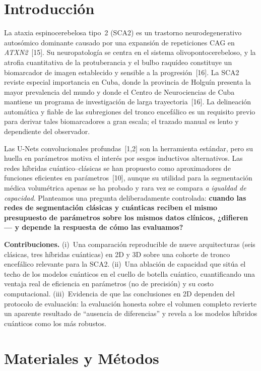 \documentclass[runningheads]{llncs}
\begin{document}
\section{Introducción}
La ataxia espinocerebelosa tipo~2 (SCA2) es un trastorno neurodegenerativo
autosómico dominante causado por una expansión de repeticiones CAG en
\emph{ATXN2}~[15]. Su neuropatología se centra en el sistema
olivopontocerebeloso, y la atrofia cuantitativa de la protuberancia y el bulbo
raquídeo constituye un biomarcador de imagen establecido y sensible a la
progresión~[16]. La SCA2 reviste especial importancia en Cuba, donde
la provincia de Holguín presenta la mayor prevalencia del mundo y donde el
Centro de Neurociencias de Cuba mantiene un programa de investigación de larga
trayectoria~[16]. La delineación automática y fiable de las
subregiones del tronco encefálico es un requisito previo para derivar tales
biomarcadores a gran escala; el trazado manual es lento y dependiente del
observador.

Las U-Nets convolucionales profundas~[1,2] son la herramienta
estándar, pero su huella en parámetros motiva el interés por sesgos inductivos
alternativos. Las redes híbridas cuántico--clásicas se han propuesto como
aproximadores de funciones eficientes en parámetros~[10], aunque su
utilidad para la segmentación médica volumétrica apenas se ha probado y rara vez
se compara \emph{a igualdad de capacidad}. Planteamos una pregunta
deliberadamente controlada: \textbf{cuando las redes de segmentación clásicas y
cuánticas reciben el mismo presupuesto de parámetros sobre los mismos datos
clínicos, ¿difieren --- y depende la respuesta de cómo las evaluamos?}

\noindent\textbf{Contribuciones.}
(i)~Una comparación reproducible de nueve arquitecturas (seis clásicas, tres
híbridas cuánticas) en 2D y 3D sobre una cohorte de tronco encefálico relevante
para la SCA2.
(ii)~Una ablación de capacidad que sitúa el techo de los modelos cuánticos en el
cuello de botella cuántico, cuantificando una ventaja real de eficiencia en
parámetros (no de precisión) y su costo computacional.
(iii)~Evidencia de que las conclusiones en 2D dependen del protocolo de
evaluación: la evaluación honesta sobre el volumen completo revierte un aparente
resultado de ``ausencia de diferencias'' y revela a los modelos híbridos
cuánticos como los más robustos.

\section{Materiales y Métodos}
\end{document}
